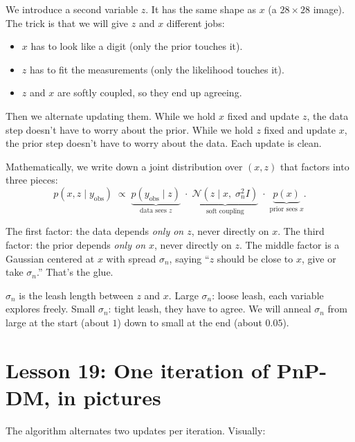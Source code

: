 \documentclass[11pt]{article}
\begin{document}
We introduce a second variable $z$. It has the same shape as $x$ (a
$28 \times 28$ image). The trick is that we will give $z$ and $x$
different jobs:
\begin{itemize}[leftmargin=2em]
\item $x$ has to look like a digit (only the prior touches it).
\item $z$ has to fit the measurements (only the likelihood touches it).
\item $z$ and $x$ are softly coupled, so they end up agreeing.
\end{itemize}

Then we alternate updating them. While we hold $x$ fixed and update $z$,
the data step doesn't have to worry about the prior. While we hold $z$
fixed and update $x$, the prior step doesn't have to worry about the
data. Each update is clean.

Mathematically, we write down a joint distribution over $(x, z)$ that
factors into three pieces:
\[
p(x, z \mid y_{\text{obs}})
\;\propto\;
\underbrace{p(y_{\text{obs}} \mid z)}_{\text{data sees }z}
\;\cdot\;
\underbrace{\mathcal{N}(z \mid x,\; \sigma_n^2 I)}_{\text{soft coupling}}
\;\cdot\;
\underbrace{p(x)}_{\text{prior sees }x}.
\]

The first factor: the data depends \emph{only on $z$}, never directly
on $x$. The third factor: the prior depends \emph{only on $x$}, never
directly on $z$. The middle factor is a Gaussian centered at $x$ with
spread $\sigma_n$, saying ``$z$ should be close to $x$, give or take
$\sigma_n$.'' That's the glue.

\begin{intuition}
$\sigma_n$ is the leash length between $z$ and $x$. Large $\sigma_n$:
loose leash, each variable explores freely. Small $\sigma_n$: tight
leash, they have to agree. We will anneal $\sigma_n$ from large at the
start (about $1$) down to small at the end (about $0.05$).
\end{intuition}

\section{Lesson 19: One iteration of PnP-DM, in pictures}

The algorithm alternates two updates per iteration. Visually:
\end{document}
